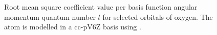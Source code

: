 \begin{figure}[hp!]
	\centering
	\caption[
		Root mean square coefficient value
		per angular momentum for nitrogen
	]
	{
		Root mean square coefficient value per
		basis function angular momentum quantum number $l$
		for selected orbitals of oxygen.
		The atom is modelled
		in a cc-pV6Z basis using \UHF.
	}


	\label{fig:RMSLF_O_Gauss}
\end{figure}


